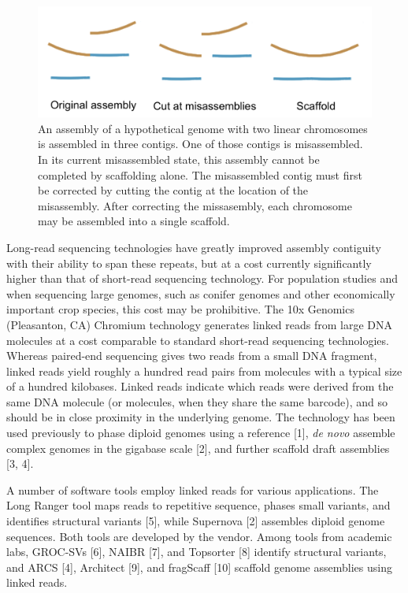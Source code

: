 \documentclass{bmcart}
\begin{document}
\begin{figure}[!htbp]
\hypertarget{fig:diagram}{%
\centering
\includegraphics[width=4.8in]{figures/diagram.png}
\caption{An assembly of a hypothetical genome with two linear chromosomes is assembled in three contigs. One of those contigs is misassembled. In its current misassembled state, this assembly cannot be completed by scaffolding alone. The misassembled contig must first be corrected by cutting the contig at the location of the misassembly. After correcting the missasembly, each chromosome may be assembled into a single scaffold.}\label{fig:diagram}
}
\end{figure}

Long-read sequencing technologies have greatly improved assembly contiguity with their ability to span these repeats, but at a cost currently significantly higher than that of short-read sequencing technology. For population studies and when sequencing large genomes, such as conifer genomes and other economically important crop species, this cost may be prohibitive. The 10x Genomics (Pleasanton, CA) Chromium technology generates linked reads from large DNA molecules at a cost comparable to standard short-read sequencing technologies. Whereas paired-end sequencing gives two reads from a small DNA fragment, linked reads yield roughly a hundred read pairs from molecules with a typical size of a hundred kilobases. Linked reads indicate which reads were derived from the same DNA molecule (or molecules, when they share the same barcode), and so should be in close proximity in the underlying genome. The technology has been used previously to phase diploid genomes using a reference {[}1{]}, \emph{de novo} assemble complex genomes in the gigabase scale {[}2{]}, and further scaffold draft assemblies {[}3, 4{]}.

A number of software tools employ linked reads for various applications. The Long Ranger tool maps reads to repetitive sequence, phases small variants, and identifies structural variants {[}5{]}, while Supernova {[}2{]} assembles diploid genome sequences. Both tools are developed by the vendor. Among tools from academic labs, GROC-SVs {[}6{]}, NAIBR {[}7{]}, and Topsorter {[}8{]} identify structural variants, and ARCS {[}4{]}, Architect {[}9{]}, and fragScaff {[}10{]} scaffold genome assemblies using linked reads.
\end{document}
